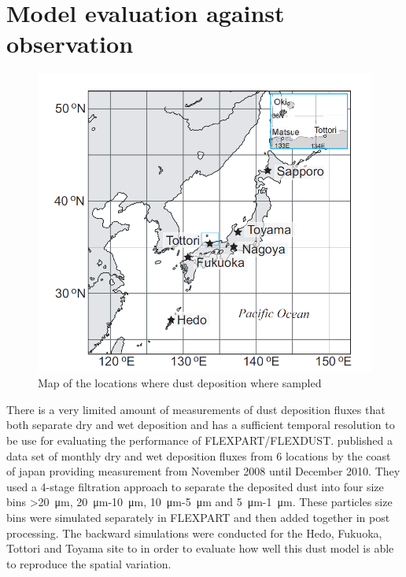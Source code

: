 \section{Model evaluation against observation}\label{sec:model_eval}
\begin{figure}
    \centering
    \includegraphics[scale=0.45]{texfiles/figs/Osada_locations.PNG}
    \caption{Map of the locations where dust deposition where sampled \parencite{osada2014wet}}
    \label{fig:map_japan}
\end{figure}
There is a very limited amount of measurements of dust deposition fluxes that both separate dry and wet deposition and has a sufficient temporal resolution to be use for evaluating the performance of FLEXPART/FLEXDUST. \textcite{osada2014wet} published a data set of monthly dry and wet deposition fluxes from 6 locations by the coast of japan providing measurement from November 2008 until December 2010. They used a 4-stage filtration approach to separate the deposited dust into four size bins  >\SI{20}{\micro\metre}, \SI{20}{\micro\metre}-\SI{10}{\micro\metre}, \SI{10}{\micro\metre}-\SI{5}{\micro\metre} and \SI{5}{\micro\metre}-\SI{1}{\micro\metre}. These particles size bins were simulated separately in FLEXPART and then added together in post processing. The backward simulations were conducted for the Hedo, Fukuoka, Tottori and Toyama site to in order to evaluate how well this dust model is able to reproduce the spatial variation. 

